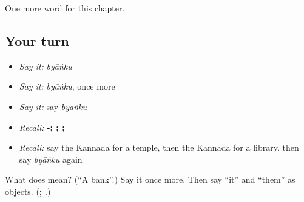 \begin{grammarlens}[title={What you've built}]
One more word for this chapter.
\end{grammarlens}

\subsection*{Your turn}
\begin{itemize}
\raggedright
  \item \emph{Say it:} \emph{byāṅku}
  \item \emph{Say it:} \emph{byāṅku}, once more
  \item \emph{Say it:} say \emph{byāṅku}
  \item \emph{Recall:} \textbf{-; ; ; }
  \item \emph{Recall:} say the Kannada for a temple, then the Kannada for a library, then say \emph{byāṅku} again
\end{itemize}

\begin{tcolorbox}[breakable,colback=teal!4,colframe=teal!35!black,title={Before you move on}]
What does  mean? (\textquotedblleft{}A bank\textquotedblright{}.) Say it once more. Then say “it” and “them” as objects. (\textbf{; }.)
\end{tcolorbox}
